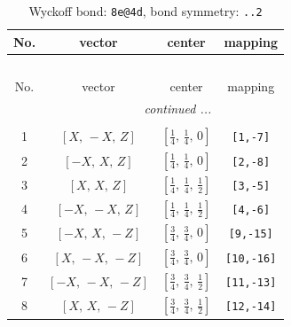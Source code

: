 \documentclass[fleqn,8pt]{jsarticle}
\begin{document}
\begin{longtable}{cccc}
\caption{Wyckoff bond: {\tt 8e@4d}, bond symmetry: {\tt ..2}}
 \\
 \hline \hline
No. & vector & center & mapping \\ \hline \endfirsthead

\multicolumn{3}{l}{\tablename\ \thetable{}} \\
 \hline \hline
No. & vector & center & mapping \\ \hline \endhead

 \hline \hline
\multicolumn{3}{r}{\footnotesize\it continued ...} \\ \endfoot

 \hline \hline
\multicolumn{3}{r}{} \\ \endlastfoot

1 & $\left[ X,\, - X,\, Z \right]$ & $\left[ \frac{1}{4},\, \frac{1}{4},\, 0 \right]$ & {\tt [1,-7]} \\ \hline
2 & $\left[ - X,\, X,\, Z \right]$ & $\left[ \frac{1}{4},\, \frac{1}{4},\, 0 \right]$ & {\tt [2,-8]} \\ \hline
3 & $\left[ X,\, X,\, Z \right]$ & $\left[ \frac{1}{4},\, \frac{1}{4},\, \frac{1}{2} \right]$ & {\tt [3,-5]} \\ \hline
4 & $\left[ - X,\, - X,\, Z \right]$ & $\left[ \frac{1}{4},\, \frac{1}{4},\, \frac{1}{2} \right]$ & {\tt [4,-6]} \\ \hline
5 & $\left[ - X,\, X,\, - Z \right]$ & $\left[ \frac{3}{4},\, \frac{3}{4},\, 0 \right]$ & {\tt [9,-15]} \\ \hline
6 & $\left[ X,\, - X,\, - Z \right]$ & $\left[ \frac{3}{4},\, \frac{3}{4},\, 0 \right]$ & {\tt [10,-16]} \\ \hline
7 & $\left[ - X,\, - X,\, - Z \right]$ & $\left[ \frac{3}{4},\, \frac{3}{4},\, \frac{1}{2} \right]$ & {\tt [11,-13]} \\ \hline
8 & $\left[ X,\, X,\, - Z \right]$ & $\left[ \frac{3}{4},\, \frac{3}{4},\, \frac{1}{2} \right]$ & {\tt [12,-14]} \\
\end{longtable}
\renewcommand{\arraystretch}{1.2}
\end{document}
